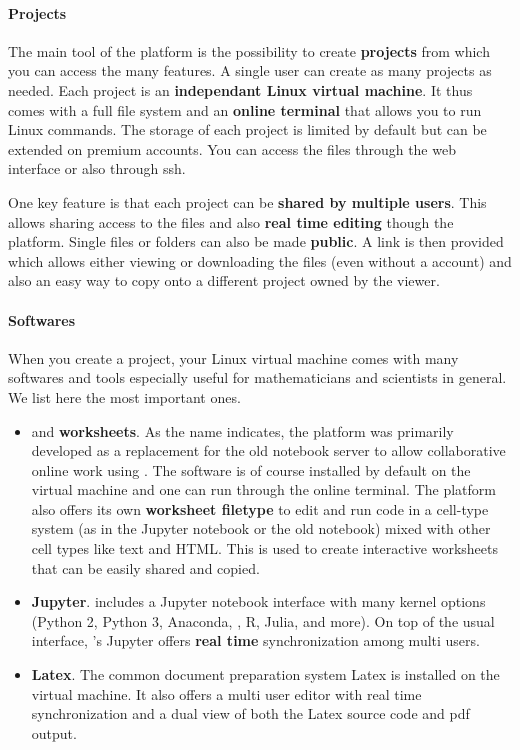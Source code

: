 \documentclass{deliverablereport}
\begin{document}
\paragraph{Projects}

The main tool of the \SMC platform is the possibility to create
\textbf{projects} from which you can access the many features. A
single user can create as many projects as needed. Each project is an
\textbf{independant Linux virtual machine}. It thus comes with a full
file system and an \textbf{online terminal} that allows you to run
Linux commands. The storage of each project is limited by default but
can be extended on premium accounts. You can access the files through
the \SMC web interface or also through ssh.

One key feature is that each project can be \textbf{shared by multiple
  users}. This allows sharing access to the files and also
\textbf{real time editing} though the platform. Single files or
folders can also be made \textbf{public}. A link is then provided
which allows either viewing or downloading the files (even without a
\SMC account) and also an easy way to copy onto a different \SMC
project owned by the viewer.

\paragraph{Softwares}

When you create a \SMC project, your Linux virtual machine comes with
many softwares and tools especially useful for mathematicians and
scientists in general.  We list here the most important ones.

\begin{itemize}
\item \Sage and \Sage \textbf{worksheets}. As the name indicates, the
  platform was primarily developed as a replacement for the old \Sage
  notebook server to allow collaborative online work using \Sage. The
  \Sage software is of course installed by default on the virtual
  machine and one can run \Sage through the online terminal. The
  platform also offers its own \Sage \textbf{worksheet filetype} to
  edit and run \Sage code in a cell-type system (as in the Jupyter
  notebook or the old \Sage notebook) mixed with other cell types like
  text and HTML. This is used to create interactive worksheets that
  can be easily shared and copied.
\item \textbf{Jupyter}. \SMC includes a Jupyter notebook interface
  with many kernel options (Python 2, Python 3, Anaconda, \Sage, R,
  Julia, and more). On top of the usual interface, \SMC's Jupyter
  offers \textbf{real time} synchronization among multi users.
\item \textbf{Latex}. The common document preparation system Latex is
  installed on the virtual machine. It also offers a multi user editor
  with real time synchronization and a dual view of both the Latex
  source code and pdf output.
\end{itemize}
\end{document}
